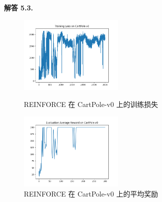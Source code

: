 \documentclass[12pt, a4paper, oneside]{ctexart}
\newenvironment{solution}[1]{\par\noindent\textbf{解答 #1. }\par}{\par}
\begin{document}
\begin{solution}{5.3}
\begin{figure}[htbp]
        \centering
        \begin{minipage}[t]{0.48\textwidth}
        \centering
        \includegraphics[width=5cm]{../code/policy_gradient/figs/Training Loss on CartPole-v0 with algorithm REINFORCE .png}
        \caption{REINFORCE 在 CartPole-v0 上的训练损失}
        \end{minipage}
        \begin{minipage}[t]{0.48\textwidth}
        \centering
        \includegraphics[width=5cm]{../code/policy_gradient/figs/Evaluation Average Reward on CartPole-v0 with algorithm REINFORCE.png}
        \caption{REINFORCE 在 CartPole-v0 上的平均奖励}
        \end{minipage}

    \end{figure}

    \begin{figure}[htbp]


\end{figure}
\end{solution}
\end{document}
